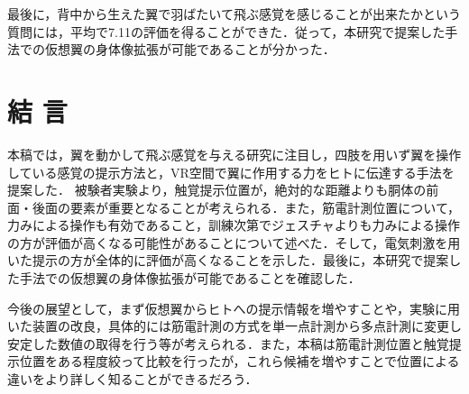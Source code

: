\begin{small}
        最後に，背中から生えた翼で羽ばたいて飛ぶ感覚を感じることが出来たかという質問には，平均で7.11の評価を得ることができた．従って，本研究で提案した手法での仮想翼の身体像拡張が可能であることが分かった．


\section{結   言}
    本稿では，翼を動かして飛ぶ感覚を与える研究に注目し，四肢を用いず翼を操作している感覚の提示方法と，VR空間で翼に作用する力をヒトに伝達する手法を提案した．
    被験者実験より，触覚提示位置が，絶対的な距離よりも胴体の前面・後面の要素が重要となることが考えられる．また，筋電計測位置について，力みによる操作も有効であること，訓練次第でジェスチャよりも力みによる操作の方が評価が高くなる可能性があることについて述べた．そして，電気刺激を用いた提示の方が全体的に評価が高くなることを示した．最後に，本研究で提案した手法での仮想翼の身体像拡張が可能であることを確認した．
    
    今後の展望として，まず仮想翼からヒトへの提示情報を増やすことや，実験に用いた装置の改良，具体的には筋電計測の方式を単一点計測から多点計測に変更し安定した数値の取得を行う等が考えられる．また，本稿は筋電計測位置と触覚提示位置をある程度絞って比較を行ったが，これら候補を増やすことで位置による違いをより詳しく知ることができるだろう．
  


{
\scriptsize %


}

\end{small}

